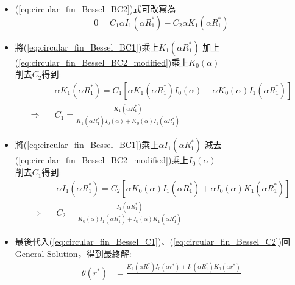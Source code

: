 \documentclass[../main.tex]{subfiles}
\begin{document}
\begin{itemize}
\begin{itemize}
      \item (\ref{eq:circular_fin_Bessel_BC2})式可改寫為
      \begin{equation}
        0 = C_1\alpha I_1\left(\alpha R_1^\ast\right)
        - C_2 \alpha K_1\left(\alpha R_1^\ast\right) \label{eq:circular_fin_Bessel_BC2_modified}
      \end{equation}
      \item 將(\ref{eq:circular_fin_Bessel_BC1})乘上$K_1\left(\alpha R_1^\ast\right)$
      加上(\ref{eq:circular_fin_Bessel_BC2_modified})乘上$K_0\left(\alpha \right)$\\
      削去$C_2$得到:
      \begin{align}
        & \alpha  K_1\left(\alpha  R_1^\ast\right)
        = C_1 \left[
          \alpha K_1\left(\alpha  R_1^\ast\right) I_0\left(\alpha \right)
          + \alpha K_0\left(\alpha \right) I_1\left(\alpha  R_1^\ast\right)
        \right] \nonumber\\
        \Rightarrow\quad & C_1 = \frac{K_1\left(\alpha  R_1^\ast\right)}
        {K_1\left(\alpha  R_1^\ast\right) I_0\left(\alpha \right)
          + K_0\left(\alpha \right) I_1\left(\alpha  R_1^\ast\right)} \label{eq:circular_fin_Bessel_C1}
      \end{align}
      \item 將(\ref{eq:circular_fin_Bessel_BC1})乘上$\alpha I_1\left(\alpha  R_1^\ast\right)$
      減去(\ref{eq:circular_fin_Bessel_BC2_modified})乘上$I_0\left(\alpha \right)$\\
      削去$C_1$得到:
      \begin{align}
        & \alpha  I_1\left(\alpha  R_1^\ast\right)
        = C_2 \left[
          \alpha K_0\left(\alpha \right) I_1\left(\alpha  R_1^\ast\right)
          + \alpha I_0\left(\alpha \right) K_1\left(\alpha  R_1^\ast\right)
        \right] \nonumber\\
        \Rightarrow\quad & C_2 = \frac{I_1\left(\alpha  R_1^\ast\right)}
        {K_0\left(\alpha \right) I_1\left(\alpha  R_1^\ast\right)
          + I_0\left(\alpha \right) K_1\left(\alpha  R_1^\ast\right)} \label{eq:circular_fin_Bessel_C2}
      \end{align}
      \item 最後代入(\ref{eq:circular_fin_Bessel_C1})、(\ref{eq:circular_fin_Bessel_C2})回General Solution，得到最終解:
      \begin{align}
        \theta(r^\ast) &= \frac{K_1\left(\alpha  R_1^\ast\right) I_0\left(\alpha r^\ast\right)
        + I_1\left(\alpha  R_1^\ast\right) K_0\left(\alpha r^\ast\right)}{
}
\end{align}
\end{itemize}
\end{itemize}
\end{document}
